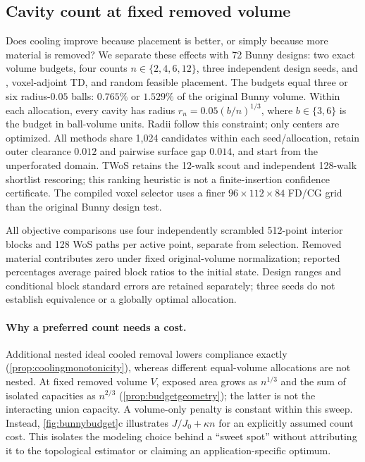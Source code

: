 

\subsection{Cavity count at fixed removed volume}
\label{sec:bunnybudget}

Does cooling improve because placement is better, or simply because more
material is removed? We separate these effects with 72 Bunny designs:
two exact volume budgets, four counts $n\in\{2,4,6,12\}$, three independent
design seeds, and \method{}, voxel-adjoint TD, and random feasible placement.
The budgets equal three or six radius-$0.05$ balls: $0.765\%$ or $1.529\%$
of the original Bunny volume. Within each allocation, every cavity has
radius $r_n=0.05(b/n)^{1/3}$, where $b\in\{3,6\}$ is the budget in ball-volume
units. Radii follow this constraint; only centers are optimized. All methods
share 1,024 candidates within each seed/allocation, retain outer clearance
$0.012$ and pairwise surface gap $0.014$, and start from the unperforated domain.
TWoS retains the 12-walk scout and independent 128-walk shortlist rescoring;
this ranking heuristic is not a finite-insertion confidence certificate.
The compiled voxel selector uses a finer $96\times112\times84$ FD/CG grid
than the original Bunny design test.





All objective comparisons use four independently scrambled 512-point
interior blocks and 128 WoS paths per active point, separate from selection.
Removed material contributes zero under fixed original-volume normalization;
reported percentages average paired block ratios to the initial state.
Design ranges and conditional block standard errors are retained separately;
three seeds do not establish equivalence or a globally optimal allocation.

\paragraph{Why a preferred count needs a cost.}
Additional nested ideal cooled removal lowers compliance exactly
(\cref{prop:coolingmonotonicity}), whereas different equal-volume allocations
are not nested. At fixed removed volume $V$, exposed area grows as $n^{1/3}$
and the sum of isolated capacities as $n^{2/3}$ (\cref{prop:budgetgeometry});
the latter is not the interacting union capacity. A volume-only penalty is
constant within this sweep. Instead, \cref{fig:bunnybudget}c illustrates
$J/J_0+\kappa n$ for an explicitly assumed count cost. This isolates the
modeling choice behind a ``sweet spot'' without attributing it to the
topological estimator or claiming an application-specific optimum.
